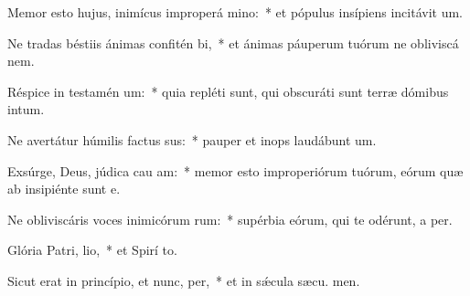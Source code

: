 \item Memor esto hujus, inimícus improperá mino:~* et pópulus insípiens incitávit  um.
\item Ne tradas béstiis ánimas confitén bi,~* et ánimas páuperum tuórum ne obliviscá  nem.
\item Réspice in testamén um:~* quia repléti sunt, qui obscuráti sunt terræ dómibus intum.
\item Ne avertátur húmilis factus sus:~* pauper et inops laudábunt  um.
\item Exsúrge, Deus, júdica cau am:~* memor esto improperiórum tuórum, eórum quæ ab insipiénte sunt  e.
\item Ne obliviscáris voces inimicórum rum:~* supérbia eórum, qui te odérunt, a per.
\item Glória Patri,  lio,~* et Spirí to.
\item Sicut erat in princípio, et nunc,  per,~* et in sǽcula sæcu. men.
